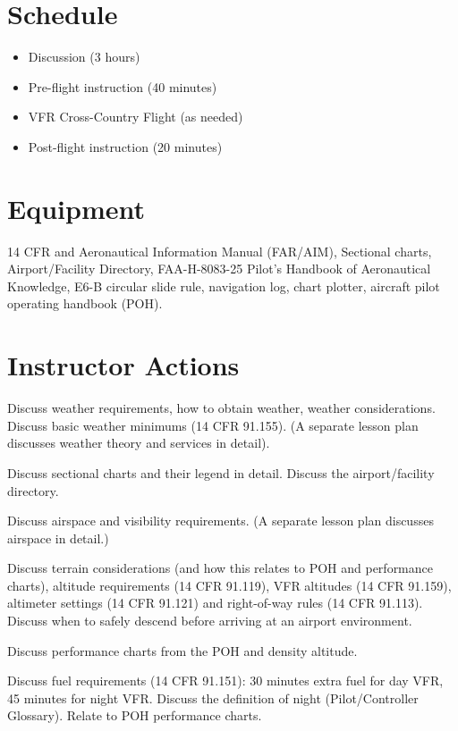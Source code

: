 \documentclass[twoside,openright]{report}
\begin{document}
\section{Schedule}

\begin{itemize}
  \item Discussion (3 hours)
  \item Pre-flight instruction (40 minutes)
  \item VFR Cross-Country Flight (as needed)
  \item Post-flight instruction (20 minutes)
\end{itemize}

\section{Equipment}

14 CFR and Aeronautical Information Manual (FAR/AIM), Sectional charts,
Airport/Facility Directory, FAA-H-8083-25 Pilot's Handbook of Aeronautical
Knowledge, E6-B circular slide rule, navigation log, chart plotter, aircraft
pilot operating handbook (POH).

\section{Instructor Actions}

Discuss weather requirements, how to obtain weather, weather considerations.
Discuss basic weather minimums (14 CFR 91.155). (A separate lesson plan
discusses weather theory and services in detail).

Discuss sectional charts and their legend in detail. Discuss the
airport/facility directory.

Discuss airspace and visibility requirements. (A separate lesson plan discusses
airspace in detail.)

Discuss terrain considerations (and how this relates to POH and performance
charts), altitude requirements (14 CFR 91.119), VFR altitudes (14 CFR 91.159),
altimeter settings (14 CFR 91.121) and right-of-way rules (14 CFR 91.113).
Discuss when to safely descend before arriving at an airport environment.

Discuss performance charts from the POH and density altitude.

Discuss fuel requirements (14 CFR 91.151): 30 minutes extra fuel for day VFR,
45 minutes for night VFR. Discuss the definition of night (Pilot/Controller
Glossary). Relate to POH performance charts.
\end{document}
